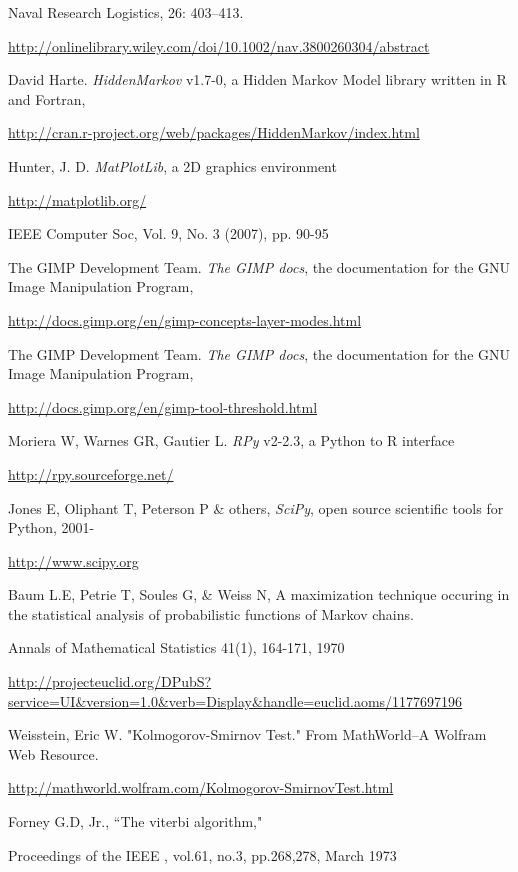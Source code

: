 \documentclass{report}
\begin{document}
\begin{thebibliography}{9}
	Naval Research Logistics, 26: 403–413.

	\url{http://onlinelibrary.wiley.com/doi/10.1002/nav.3800260304/abstract}

	David Harte. \emph{HiddenMarkov} v1.7-0, a Hidden Markov Model library written in R and Fortran, 

	\url{http://cran.r-project.org/web/packages/HiddenMarkov/index.html}

	Hunter, J. D. \emph{MatPlotLib}, a 2D graphics environment 

	\url{http://matplotlib.org/}

	IEEE Computer Soc, Vol. 9, No. 3 (2007), pp. 90-95

 The GIMP Development Team. \emph{The GIMP docs}, the documentation for the GNU Image Manipulation Program, 

\url{http://docs.gimp.org/en/gimp-concepts-layer-modes.html}

 The GIMP Development Team. \emph{The GIMP docs}, the documentation for the GNU Image Manipulation Program, 

\url{http://docs.gimp.org/en/gimp-tool-threshold.html}

 Moriera W, Warnes GR, Gautier L. \emph{RPy} v2-2.3, a Python to R interface

\url{http://rpy.sourceforge.net/}

 Jones E, Oliphant T, Peterson P \& others, \emph{SciPy}, open source scientific tools for Python, 2001-

\url{http://www.scipy.org}

 Baum L.E, Petrie T, Soules G, \& Weiss N, A maximization technique occuring in the statistical analysis of probabilistic functions of Markov chains.

Annals of Mathematical Statistics 41(1), 164-171, 1970

\url{http://projecteuclid.org/DPubS?service=UI&version=1.0&verb=Display&handle=euclid.aoms/1177697196}

 Weisstein, Eric W. "Kolmogorov-Smirnov Test." From MathWorld--A Wolfram Web Resource.

	\url{http://mathworld.wolfram.com/Kolmogorov-SmirnovTest.html}

 Forney G.D, Jr., ``The viterbi algorithm,"

Proceedings of the IEEE , vol.61, no.3, pp.268,278, March 1973


\end{thebibliography}
\end{document}
